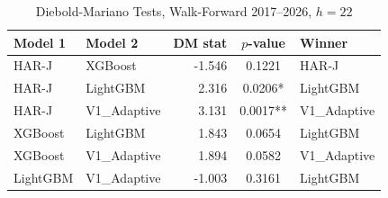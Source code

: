 \begin{table}[htbp]
\centering
\caption{Diebold-Mariano Tests, Walk-Forward 2017--2026, $h=22$}
\label{tab:dm_wf_h22}
\begin{tabular}{llrcl}
\toprule
Model 1 & Model 2 & DM stat & $p$-value & Winner \\
\midrule
HAR-J & XGBoost & -1.546 & 0.1221 & HAR-J \\
HAR-J & LightGBM & 2.316 & 0.0206* & LightGBM \\
HAR-J & V1\_Adaptive & 3.131 & 0.0017** & V1\_Adaptive \\
XGBoost & LightGBM & 1.843 & 0.0654 & LightGBM \\
XGBoost & V1\_Adaptive & 1.894 & 0.0582 & V1\_Adaptive \\
LightGBM & V1\_Adaptive & -1.003 & 0.3161 & LightGBM \\
\bottomrule
\end{tabular}
\end{table}